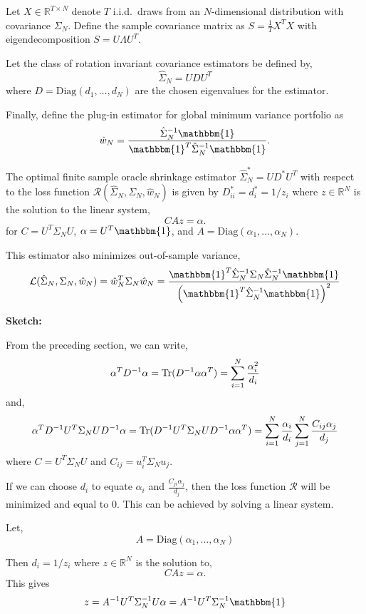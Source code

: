 \documentclass{article}
\begin{document}
\begin{thm}
	Let $X \in \mathbb{R}^{T \times N}$ denote $T$ i.i.d.\ draws from an
	$N$-dimensional distribution with covariance $\Sigma_N$.  Define the sample
	covariance matrix as $S = \frac1T X^T X$ with eigendecomposition $S = U\Lambda
	U^T$.

	Let the class of rotation invariant covariance estimators be defined by,
	$$
		\hat{\Sigma}_N = U D U^T
	$$
	where $D= \mathrm{Diag}({d}_1, \ldots, {d}_N)$ are the chosen eigenvalues for
	the estimator.

	Finally, define the plug-in estimator for global minimum variance portfolio
	as
	$$
		\hat{w}_N = \frac{\hat{\Sigma}_N^{-1}\mathbbm{1}}
						{\mathbbm{1}^T\hat{\Sigma}_N^{-1}\mathbbm{1}}.
	$$

	The optimal finite sample oracle shrinkage estimator $\hat{\Sigma}^*_N = U D^*
	U^T$ with respect to the loss function $\mathcal{R}(\hat{\Sigma}_N, \Sigma_N,
	\hat{w}_N)$ is given by $D^*_{ii} = d^*_i = 1 / z_i$ where $z \in
	\mathbb{R}^N$ is the solution to the linear system,
	$$
		C A z = \alpha.
	$$
	for $C = U^T\Sigma_N U$, $\alpha = U^T \mathbbm{1}$, and $A =
	\mathrm{Diag}(\alpha_1, \ldots, \alpha_N)$.

	This estimator also minimizes out-of-sample variance,
	$$
		\mathcal{L}(\hat{\Sigma}_N, \Sigma_N, \hat{w}_N)
			 = \hat{w}_N^T \Sigma_N \hat{w}_N
			 = \frac
  				{\mathbbm{1}^T \hat{\Sigma}_N^{-1} \Sigma_N  \hat{\Sigma}_N^{-1} \mathbbm{1}}
  				{\left( \mathbbm{1}^T \hat{\Sigma}_N^{-1} \mathbbm{1}\right)^2}
	$$
\end{thm}

{\bf Sketch:}

From the preceding section, we can write,
$$
	\alpha^T D^{-1} \alpha 
		 = \mathrm{Tr}(D^{-1} \alpha \alpha^T)
		 = \sum_{i=1}^N \frac{\alpha_i^2}{{d}_i}
$$
and,
$$
	\alpha^T D^{-1} U^T\Sigma_N U D^{-1} \alpha
		 = \mathrm{Tr}(D^{-1} U^T\Sigma_N U D^{-1} \alpha \alpha^T)
		 = \sum_{i=1}^N \frac{\alpha_i}{{d}_i} 
		 			\sum_{j=1}^N \frac{C_{ij}\alpha_j}{{d}_j}
$$
where $C = U^T\Sigma_N U$ and $C_{ij} = u_i^T \Sigma_N u_j$.

If we can choose ${d}_i$ to equate $\alpha_i$ and
$\frac{C_{ji}\alpha_j}{{d}_j}$, then the loss function
$\mathcal{R}$ will be minimized and equal to 0.  This can be achieved by solving
a linear system.

Let,
$$
	A = \mathrm{Diag}(\alpha_1, \ldots, \alpha_N)
$$

Then ${d}_i = 1 / z_i$ where $z \in \mathbb{R}^N$ is the solution to,
$$
	C A z = \alpha.
$$
This gives
$$
	z = A^{-1} U^T \Sigma_N^{-1} U \alpha
		 = A^{-1} U^T \Sigma_N^{-1} \mathbbm{1}
$$
\end{document}

